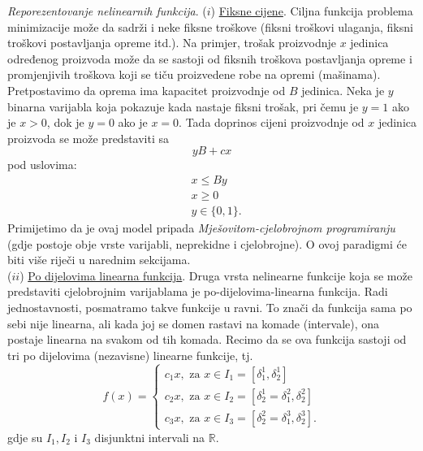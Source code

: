 \documentclass[a4paper, utf8, 11pt, colorlinks]{book}
\begin{document}
\emph{Reporezentovanje nelinearnih funkcija}. ($i$) \underline{Fiksne cijene}. Ciljna funkcija problema minimizacije može da sadrži i neke fiksne troškove (fiksni troškovi ulaganja, fiksni troškovi postavljanja opreme itd.). Na primjer, trošak proizvodnje $x$ jedinica određenog proizvoda može da se sastoji od fiksnih troškova postavljanja opreme i promjenjivih troškova koji se tiču proizvedene robe na opremi (mašinama). Pretpostavimo da oprema ima kapacitet proizvodnje od $B$ jedinica. Neka je $y$ binarna varijabla koja pokazuje kada nastaje fiksni trošak, pri čemu  je $y=1$ ako je $x >0$, dok je $y=0$ ako je $x=0$. Tada doprinos cijeni proizvodnje od $x$ jedinica proizvoda se može predstaviti sa
$$ yB + c x $$ pod uslovima:
\begin{align}
     &x \leq By \\
     & x \geq 0 \\
     & y \in \{0, 1\}.
\end{align}
Primijetimo da je ovaj model pripada \emph{Mješovitom-cjelobrojnom programiranju} (gdje postoje obje vrste varijabli, neprekidne i cjelobrojne). O ovoj paradigmi će biti više riječi u narednim sekcijama. \\
($ii$) \underline{{Po dijelovima linearna funkcija}}. Druga vrsta nelinearne funkcije koja se može predstaviti cjelobrojnim varijablama je po-dijelovima-linearna funkcija. Radi jednostavnosti, posmatramo takve funkcije u ravni. To znači da funkcija sama po sebi nije linearna, ali kada joj se domen rastavi na komade (intervale), ona postaje linearna na svakom od tih komada. Recimo da se ova funkcija sastoji od tri po dijelovima (nezavisne) linearne funkcije, tj. 
$$f(x) = \begin{cases}
          c_1 x, \mbox{ za } x \in I_1 = [\delta^1_1, \delta^1_2] \\
          c_2 x, \mbox{ za } x \in I_2 = [\delta^1_2 = \delta^2_1, \delta^2_2] \\
          c_3 x, \mbox{ za } x \in I_3 = [\delta^2_2 = \delta^3_1, \delta^3_2].
      \end{cases}
$$
gdje su $I_1, I_2$ i $I_3$ disjunktni intervali na $\mathbb{R}$.
\end{document}

